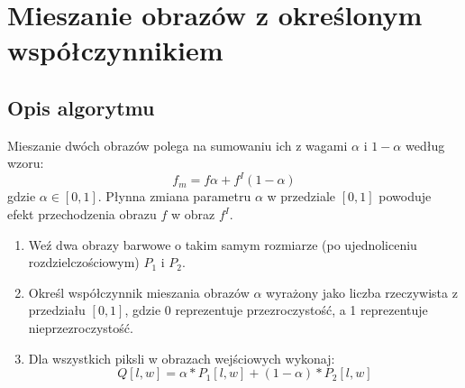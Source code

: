 \documentclass[a4paper,12pt, titlepage]{report}
\begin{document}
\section{Mieszanie obrazów z określonym współczynnikiem}
\subsection*{Opis algorytmu}
\par Mieszanie dwóch obrazów polega na sumowaniu ich z wagami \(\alpha\) i \(1-\alpha\) według wzoru: \[f_{m}=f\alpha+f^{I}(1-\alpha)\] gdzie \(\alpha\in[0,1]\). Płynna zmiana parametru \(\alpha\) w przedziale \([0,1]\) powoduje efekt przechodzenia obrazu \(f\) w obraz \(f^{I}\).
\begin{enumerate}
\item Weź dwa obrazy barwowe o takim samym rozmiarze (po ujednoliceniu rozdzielczościowym) \(P_{1}\) i \(P_{2}\).
\item Określ współczynnik mieszania obrazów \(\alpha\) wyrażony jako liczba rzeczywista z przedziału \([0,1]\), gdzie 0 reprezentuje przezroczystość, a 1 reprezentuje nieprzezroczystość.
\item Dla wszystkich piksli w obrazach wejściowych wykonaj: \[Q[l,w]=\alpha*P_{1}[l,w]+(1-\alpha)*P_{2}[l,w]\]
\end{enumerate}
\end{document}
